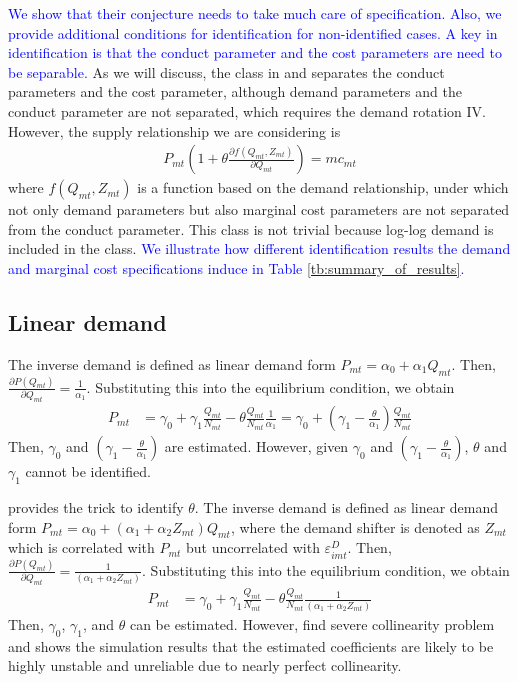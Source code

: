 \documentclass[11pt, a4paper]{article}
\begin{document}
\textcolor{blue}{We show that their conjecture needs to take much care of specification. Also, we provide additional conditions for identification for non-identified cases.
A key in identification is that the conduct parameter and the cost parameters are need to be separable.}
As we will discuss, the class in \citet{bresnahan1982oligopoly} and \citet{lau1982identifying} separates the conduct parameters and the cost parameter, although demand parameters and the conduct parameter are not separated, which requires the demand rotation IV.
However, the supply relationship we are considering is
\begin{align}
    P_{mt} \left( 1 + \theta\frac{\partial f(Q_{mt}, Z_{mt})}{\partial Q_{mt}}\right) = mc_{mt} \label{eq:supply_in_our_class}
\end{align}
where $f(Q_{mt},Z_{mt})$ is a function based on the demand relationship, under which not only demand parameters but also marginal cost parameters are not separated from the conduct parameter.
This class is not trivial because log-log demand is included in the class.
\textcolor{blue}{We illustrate how different identification results the demand and marginal cost specifications induce in Table \ref{tb:summary_of_results}. }


\subsection{Linear demand}
The inverse demand is defined as linear demand form $P_{mt}=\alpha_0+\alpha_1 Q_{mt}$. Then, $\frac{\partial P\left(Q_{m t}\right)}{\partial Q_{mt}}=\frac{1}{\alpha_1}$. Substituting this into the equilibrium condition, we obtain
\begin{align*}
    P_{m t}&=\gamma_0+\gamma_1 \frac{Q_{mt}}{N_{mt}}-\theta \frac{Q_{mt}}{N_{mt}}\frac{1}{\alpha_1}=\gamma_0+(\gamma_1-\frac{\theta}{\alpha_1}) \frac{Q_{mt}}{N_{mt}}
\end{align*}
Then, $\gamma_0$ and $(\gamma_1-\frac{\theta}{\alpha_1})$ are estimated. However, given $\gamma_0$ and $(\gamma_1-\frac{\theta}{\alpha_1})$, $\theta$ and $\gamma_1$ cannot be identified.

\cite{bresnahan1982oligopoly} provides the trick to identify $\theta$. The inverse demand is defined as linear demand form $P_{mt}=\alpha_0+(\alpha_1+\alpha_2 Z_{mt}) Q_{mt}$, where the demand shifter is denoted as $Z_{mt}$ which is correlated with $P_{mt}$ but uncorrelated with $\varepsilon_{imt}^D$. Then, $\frac{\partial P\left(Q_{m t}\right)}{\partial Q_{mt}}=\frac{1}{(\alpha_1+\alpha_2 Z_{mt})}$. Substituting this into the equilibrium condition, we obtain
\begin{align*}
    P_{m t}&=\gamma_0+\gamma_1 \frac{Q_{mt}}{N_{mt}}-\theta \frac{Q_{mt}}{N_{mt}}\frac{1}{(\alpha_1+\alpha_2 Z_{mt})}
\end{align*}
Then, $\gamma_0$, $\gamma_1$, and $\theta$ can be estimated. However,  \cite{perloff2012collinearity} find severe collinearity problem and shows the simulation results that the estimated coefficients are likely to be highly unstable and unreliable due to nearly perfect collinearity.
\end{document}
